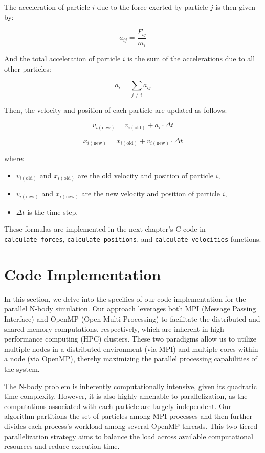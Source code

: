 \documentclass{solutionclass} %
\begin{document}
The acceleration of particle \( i \) due to the force exerted by particle \( j \) is then given by:

\[ a_{ij} = \frac{{F_{ij}}}{{m_i}} \]

And the total acceleration of particle \( i \) is the sum of the accelerations due to all other particles:

\[ a_i = \sum_{j \neq i} a_{ij} \]

Then, the velocity and position of each particle are updated as follows:

\[ v_{i(\text{new})} = v_{i(\text{old})} + a_i \cdot \Delta t \]

\[ x_{i(\text{new})} = x_{i(\text{old})} + v_{i(\text{new})} \cdot \Delta t \]

where:
\begin{itemize}
    \item \( v_{i(\text{old})} \) and \( x_{i(\text{old})} \) are the old velocity and position of particle \( i \),
    \item \( v_{i(\text{new})} \) and \( x_{i(\text{new})} \) are the new velocity and position of particle \( i \),
    \item \( \Delta t \) is the time step.
\end{itemize} 

These formulas are implemented in the next chapter's C code in \texttt{calculate\_forces}, \texttt{calculate\_positions}, and \texttt{calculate\_velocities} functions.

\divider 

\section{Code Implementation}
In this section, we delve into the specifics of our code implementation for the parallel N-body simulation. Our approach leverages both MPI (Message Passing Interface) and OpenMP (Open Multi-Processing) to facilitate the distributed and shared memory computations, respectively, which are inherent in high-performance computing (HPC) clusters. These two paradigms allow us to utilize multiple nodes in a distributed environment (via MPI) and multiple cores within a node (via OpenMP), thereby maximizing the parallel processing capabilities of the system.

The N-body problem is inherently computationally intensive, given its quadratic time complexity. However, it is also highly amenable to parallelization, as the computations associated with each particle are largely independent. Our algorithm partitions the set of particles among MPI processes and then further divides each process's workload among several OpenMP threads. This two-tiered parallelization strategy aims to balance the load across available computational resources and reduce execution time.
\end{document}
